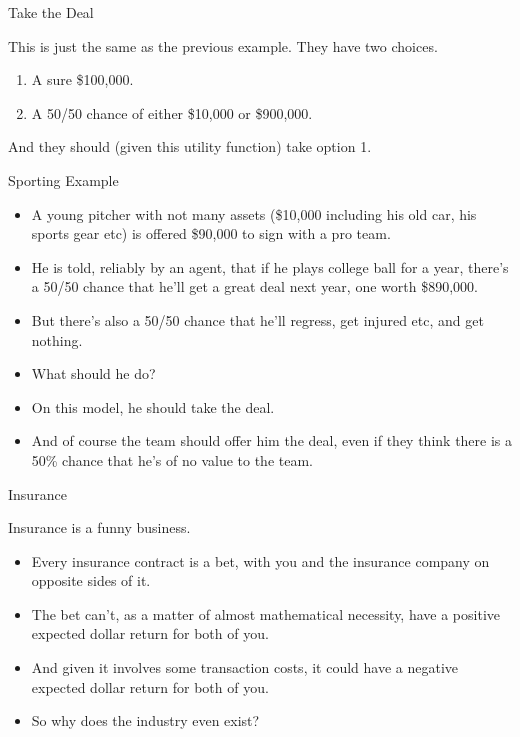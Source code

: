 \documentclass[
  ignorenonframetext,
]{beamer}
\providecommand{\tightlist}{%
  \setlength{\itemsep}{0pt}\setlength{\parskip}{0pt}}
\renewcommand{\,}{\text{, }}
\begin{document}
\begin{frame}{Take the Deal}
\protect\hypertarget{take-the-deal}{}

This is just the same as the previous example. They have two choices.

\begin{enumerate}
\tightlist
\item
  A sure \$100,000.
\item
  A 50/50 chance of either \$10,000 or \$900,000.
\end{enumerate}

And they should (given this utility function) take option 1.

\end{frame}

\begin{frame}{Sporting Example}
\protect\hypertarget{sporting-example}{}

\begin{itemize}
\tightlist
\item
  A young pitcher with not many assets (\$10,000 including his old car,
  his sports gear etc) is offered \$90,000 to sign with a pro team.
\item
  He is told, reliably by an agent, that if he plays college ball for a
  year, there's a 50/50 chance that he'll get a great deal next year,
  one worth \$890,000.
\item
  But there's also a 50/50 chance that he'll regress, get injured etc,
  and get nothing.
\item
  What should he do?
\item
  On this model, he should take the deal.
\item
  And of course the team should offer him the deal, even if they think
  there is a 50\% chance that he's of no value to the team.
\end{itemize}

\end{frame}

\begin{frame}{Insurance}
\protect\hypertarget{insurance}{}

Insurance is a funny business.

\begin{itemize}
\tightlist
\item
  Every insurance contract is a bet, with you and the insurance company
  on opposite sides of it.
\item
  The bet can't, as a matter of almost mathematical necessity, have a
  positive expected dollar return for both of you.
\item
  And given it involves some transaction costs, it could have a negative
  expected dollar return for both of you.
\item
  So why does the industry even exist?
\end{itemize}

\end{frame}
\end{document}
